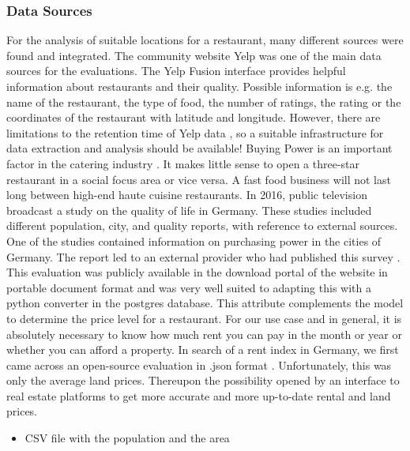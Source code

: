 \subsubsection{Data Sources}
\label{subsubsec:sources}
For the analysis of suitable locations for a restaurant, many different sources were found and integrated. The community website Yelp was one of the main data sources for the evaluations. The Yelp Fusion interface provides helpful information about restaurants and their quality.  Possible information is e.g. the name of the restaurant, the type of food, the number of ratings, the rating or the coordinates of the restaurant with latitude and longitude. However, there are limitations to the retention time of Yelp data \cite{yelp}, so a suitable infrastructure for data extraction and analysis should be available!
\newline
Buying Power is an important factor in the catering industry \cite{locana}. It makes little sense to open a three-star restaurant in a social focus area or vice versa. A fast food business will not last long between high-end haute cuisine restaurants. In 2016, public television broadcast a study on the quality of life in Germany. These studies included different population, city, and quality reports, with reference to external sources. One of the studies contained information on purchasing power in the cities of Germany. The report led to an external provider who had published this survey \cite{buyingpower}. This evaluation was publicly available in the download portal of the website in portable document format and was very well suited to adapting this with a python converter in the postgres database. This attribute complements the model to determine the price level for a restaurant.
\newline
For our use case and in general, it is absolutely necessary to know how much rent you can pay in the month or year or whether you can afford a property. In search of a rent index in Germany, we first came across an open-source evaluation in .json format \cite{Sparda}. Unfortunately, this was only the average land prices. Thereupon the possibility opened by an interface to real estate platforms \cite{ImmoScout} to get more accurate and more up-to-date rental and land prices.
\begin{itemize}
\item CSV file with the population and the area
\end{itemize}
